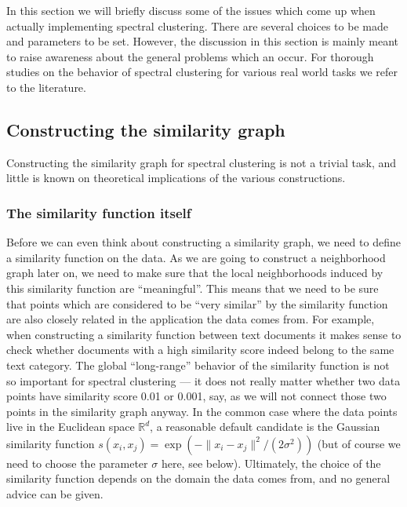 \documentclass{article}
\newcommand{\RR}{\mathbb{R}}
\newcommand{\R}{\RR}
\newcommand{\norm}[1][\cdot]{\|#1\|}
\begin{document}
In this section we will briefly discuss some of the issues which come
up when actually implementing spectral clustering. There are several
choices to be made and parameters to be set. However, the discussion
in this section is mainly meant to raise awareness about the general
problems which an occur. For thorough studies on the behavior of
spectral clustering for various real world tasks we refer to the
literature.

%
\subsection{Constructing the similarity graph}
%



Constructing the similarity graph for spectral clustering is not a
trivial task, and little is known on theoretical implications of the
various constructions.


%
\subsubsection*{The similarity function itself}
%

Before we can even think about constructing a similarity graph, we
need to define a similarity function on the data. As we are going to
construct a neighborhood graph later on, we need to make sure that the
local neighborhoods induced by this similarity function are
``meaningful''. This means that we need to be sure that points which
are considered to be ``very similar'' by the similarity function are
also closely related in the application the data comes from. For
example, when constructing a similarity function between text
documents it makes sense to check whether documents with a high
similarity score indeed belong to the same text category. The global
``long-range'' behavior of the similarity function is not so important
for spectral clustering --- it does not really matter whether two data
points have similarity score 0.01 or 0.001, say, as we will not
connect those two points in the similarity graph anyway. In the common
case where the data points live in the Euclidean space $\R^d$, a
reasonable default candidate is the Gaussian similarity function
$s(x_i,x_j) = \exp(- \norm[x_i - x_j]^2/(2\sigma^2))$ (but of course we
need to choose the parameter $\sigma$ here, see below). Ultimately,
the choice of the similarity function depends on the domain the data
comes from, and no general advice can be given.
\end{document}
